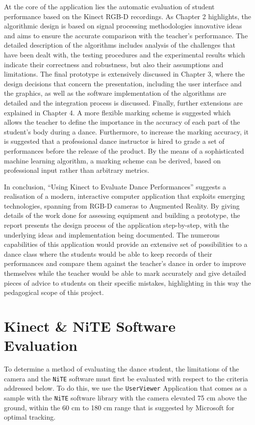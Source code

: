 \documentclass[11pt,a4paper]{article}
\begin{document}
\noindent
At the core of the application lies the automatic evaluation of student performance based on the Kinect RGB-D recordings. As Chapter 2 highlights, the algorithmic design is based on signal processing methodologies innovative ideas and aims to ensure the accurate comparison with the teacher’s performance. The detailed description of the algorithms includes analysis of the challenges that have been dealt with, the testing procedures and the experimental results which indicate their correctness and robustness, but also their assumptions and limitations. The final prototype is extensively discussed in Chapter 3, where the design decisions that concern the presentation, including the user interface and the graphics, as well as the software implementation of the algorithms are detailed and the integration process is discussed. Finally, further extensions are explained in Chapter 4. A more flexible marking scheme is suggested which allows the teacher to define the importance in the accuracy of each part of the student’s body during a dance. Furthermore, to increase the marking accuracy, it is suggested that a professional dance instructor is hired to grade a set of performances before the release of the product. By the means of a sophisticated machine learning algorithm, a marking scheme can be derived, based on professional input rather than arbitrary metrics.

\noindent
In conclusion, “Using Kinect to Evaluate Dance Performances” suggests a realisation of a modern, interactive computer application that exploits emerging technologies, spanning from RGB-D cameras to Augmented Reality. By giving details of the work done for assessing equipment and building a prototype, the report presents the design process of the application step-by-step, with the underlying ideas and implementation being documented. The numerous capabilities of this application would provide an extensive set of possibilities to a dance class where the students would be able to keep records of their performances and compare them against the teacher’s dance in order to improve themselves while the teacher would be able to mark accurately and give detailed pieces of advice to students on their specific mistakes, highlighting in this way the pedagogical scope of this project.

\clearpage

\setcounter{page}{1}
\section{Kinect \& NiTE Software Evaluation}
\noindent
To determine a method of evaluating the dance student, the limitations of the camera and the \texttt{NiTE} software must first be evaluated with respect to the criteria addressed below. To do this, we use the \texttt{UserViewer} Application that comes as a sample with the \texttt{NiTE} software library with the camera elevated 75 cm above the ground, within the 60 cm to 180 cm range that is suggested by Microsoft for optimal tracking. 
\end{document}
